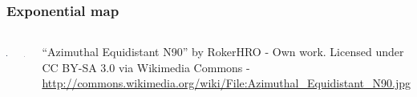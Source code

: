 \begin{frame}
\frametitle{Exponential map}
\begin{columns}[c]
\includegraphics[width=\textwidth]{900px-Azimuthal_Equidistant_N90}
\begin{center}
\includegraphics[width=\textwidth]{spheres}
\end{center}
{\fontsize{0.12cm}{0.1em}\selectfont
``Azimuthal Equidistant N90'' by RokerHRO - Own work. Licensed under CC BY-SA 3.0 via Wikimedia Commons - \url{http://commons.wikimedia.org/wiki/File:Azimuthal\_Equidistant\_N90.jpg}\par
}
\end{columns}
\end{frame}

